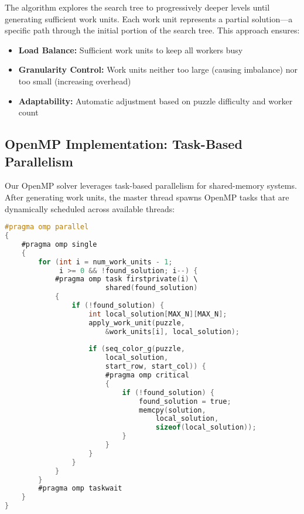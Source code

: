 The algorithm explores the search tree to progressively deeper levels until generating sufficient work units. Each work unit represents a partial solution—a specific path through the initial portion of the search tree. This approach ensures:
\begin{itemize}
    \item \textbf{Load Balance:} Sufficient work units to keep all workers busy
    \item \textbf{Granularity Control:} Work units neither too large (causing imbalance) nor too small (increasing overhead)
    \item \textbf{Adaptability:} Automatic adjustment based on puzzle difficulty and worker count
\end{itemize}

\subsection{OpenMP Implementation: Task-Based Parallelism}
Our OpenMP solver leverages task-based parallelism for shared-memory systems. After generating work units, the master thread spawns OpenMP tasks that are dynamically scheduled across available threads:

\begin{lstlisting}[language=C, caption=OpenMP task generation]
#pragma omp parallel
{
    #pragma omp single
    {
        for (int i = num_work_units - 1; 
             i >= 0 && !found_solution; i--) {
            #pragma omp task firstprivate(i) \
                        shared(found_solution)
            {
                if (!found_solution) {
                    int local_solution[MAX_N][MAX_N];
                    apply_work_unit(puzzle, 
                        &work_units[i], local_solution);
                    
                    if (seq_color_g(puzzle, 
                        local_solution, 
                        start_row, start_col)) {
                        #pragma omp critical
                        {
                            if (!found_solution) {
                                found_solution = true;
                                memcpy(solution, 
                                    local_solution, 
                                    sizeof(local_solution));
                            }
                        }
                    }
                }
            }
        }
        #pragma omp taskwait
    }
}
\end{lstlisting}

